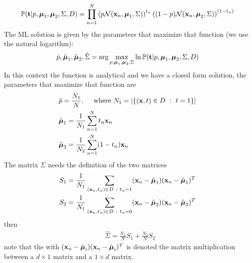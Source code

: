 \documentclass[10pt, letterpaper]{report}
\begin{document}
\begin{equation}
	{\mathbb P}(\mathbf t|p,{\boldsymbol{\mu}}_1,{\boldsymbol{\mu}}_2,\Sigma,D)=\prod_{n=1}^{N}
	\left(
	p\mathcal N(\mathbf x_n,{\boldsymbol{\mu}}_1,\Sigma)
	\right)^{t_n}
	\left(
	(1-p)\mathcal N(\mathbf x_n,{\boldsymbol{\mu}}_2,\Sigma)
	\right)^{(1-t_n)}
\end{equation}
The ML solution is given by the parameters that maximize that function (we use the natural logarithm):\begin{equation}
	\hat p,\hat{{\boldsymbol{\mu}}}_1,\hat{{\boldsymbol{\mu}}}_2,\hat\Sigma=\arg\max_{p,{\boldsymbol{\mu}}_1,{\boldsymbol{\mu}}_2,\Sigma}\ln{\mathbb P}(\mathbf t|p,{\boldsymbol{\mu}}_1,{\boldsymbol{\mu}}_2,\Sigma,D)
\end{equation}
In this context the function is analytical and we have a closed form solution, the parameters that maximize that function are\begin{align}
	 & \hat p=\frac{N_1}{N}, \ \ \ \text{ where } N_1=|\{(\mathbf x,t)\in D \ : \ t=1\}| \\
	 & \hat{{\boldsymbol{\mu}}}_1=\frac{1}{N_1}\sum_{n=1}^Nt_n\mathbf x_n                                \\
	 & \hat{{\boldsymbol{\mu}}}_2=\frac{1}{N_2}\sum_{n=1}^N(1-t_n)\mathbf x_n                            \\
\end{align}
The matrix $\Sigma$ needs the definition of the two matrices\begin{align}
	 & S_1=\frac{1}{N_1}\sum_{(\mathbf x_n,t_n)\in D \ : \ t_n=1}(\mathbf x_n-\hat \bmu_1)(\mathbf x_n-\hat \bmu_1)^T \\
	 & S_2=\frac{1}{N_1}\sum_{(\mathbf x_n,t_n)\in D \ : \ t_n=0}(\mathbf x_n-\hat \bmu_2)(\mathbf x_n-\hat \bmu_2)^T
\end{align}
then\begin{align}
	 & \hat \Sigma = \frac{N_1}{N}S_1+\frac{N_2}{N}S_2
\end{align}
note that the with $(\mathbf x_n-\hat {{\boldsymbol{\mu}}}_i)(\mathbf x_n-\hat {{\boldsymbol{\mu}}}_i)^T$ is denoted the matrix multiplication between a $d\times 1$ matrix and a $1\times d$ matrix.\bigskip
\end{document}
